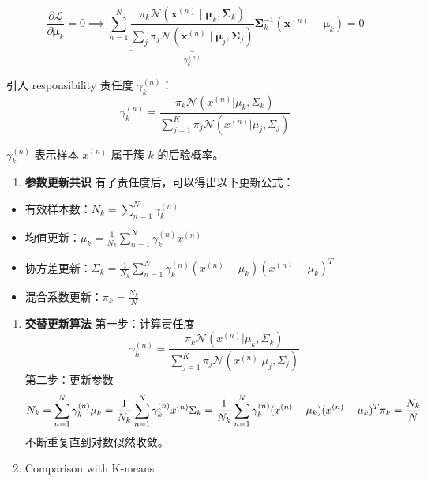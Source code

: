 \documentclass[
]{ctexart}
\providecommand{\tightlist}{%
  \setlength{\itemsep}{0pt}\setlength{\parskip}{0pt}}
\begin{document}
\[
\frac{\partial \mathcal{L}}{\partial \boldsymbol{\mu}_k} = 0
\implies
\sum_{n=1}^N
\underbrace{
\frac{
\pi_k \mathcal{N}(\mathbf{x}^{(n)} \mid \boldsymbol{\mu}_k, \boldsymbol{\Sigma}_k)
}{
\sum_j \pi_j \mathcal{N}(\mathbf{x}^{(n)} \mid \boldsymbol{\mu}_j, \boldsymbol{\Sigma}_j)
}
}_{\gamma_k^{(n)}}
\boldsymbol{\Sigma}_k^{-1} (\mathbf{x}^{(n)} - \boldsymbol{\mu}_k)
= 0
\]

引入 responsibility 责任度 \(\gamma_k^{(n)}\)：
\[\gamma_k^{(n)} = \frac{\pi_k \mathcal{N}(x^{(n)}|\mu_k, \Sigma_k)}{\sum_{j=1}^K \pi_j \mathcal{N}(x^{(n)}|\mu_j, \Sigma_j)}\]

\(\gamma_k^{(n)}\) 表示样本 \(x^{(n)}\) 属于簇 \(k\) 的后验概率。

\begin{enumerate}
\def\labelenumi{\arabic{enumi}.}
\setcounter{enumi}{3}
\tightlist
\item
  \textbf{参数更新共识} 有了责任度后，可以得出以下更新公式：
\end{enumerate}

\begin{itemize}
\tightlist
\item
  有效样本数：\(N_k = \sum_{n=1}^N \gamma_k^{(n)}\)
\item
  均值更新：\(\mu_k = \frac{1}{N_k} \sum_{n=1}^N \gamma_k^{(n)} x^{(n)}\)
\item
  协方差更新：\(\Sigma_k = \frac{1}{N_k} \sum_{n=1}^N \gamma_k^{(n)} (x^{(n)} - \mu_k)(x^{(n)} - \mu_k)^T\)
\item
  混合系数更新：\(\pi_k = \frac{N_k}{N}\)
\end{itemize}

\begin{enumerate}
\def\labelenumi{\arabic{enumi}.}
\setcounter{enumi}{4}
\item
  \textbf{交替更新算法} 第一步：计算责任度
  \[\gamma_k^{(n)} = \frac{\pi_k \mathcal{N}(x^{(n)}|\mu_k, \Sigma_k)}{\sum_{j=1}^K \pi_j \mathcal{N}(x^{(n)}|\mu_j, \Sigma_j)}\]
  第二步：更新参数 \[N_k = \sum_{n=1}^N \gamma_k^{(n)} \\
  \mu_k = \frac{1}{N_k} \sum_{n=1}^N \gamma_k^{(n)} x^{(n)} \\
  \Sigma_k = \frac{1}{N_k} \sum_{n=1}^N \gamma_k^{(n)} (x^{(n)} - \mu_k)(x^{(n)} - \mu_k)^T \\
  \pi_k = \frac{N_k}{N}\] 不断重复直到对数似然收敛。
\item
  Comparison with K-means
\end{enumerate}
\end{document}
